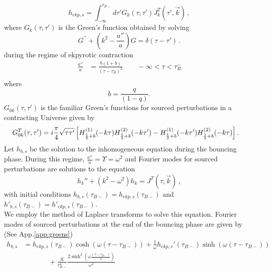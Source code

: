 \documentclass[12pt,a4paper]{article}
\numberwithin{equation}{section}
\numberwithin{equation}{section}
\begin{document}
\begin{equation}
h_{ekp,s} = \int_{-\infty}^{\tau_{B-}} d\tau' G_{k}(\tau,\tau') J^T_k (\tau',\Vec{k}) \, ,
\label{eq:vie} 
\end{equation}
where $G_k(\tau,\tau')$ is the Green's function obtained by solving
\begin{equation}
G^{ \prime \prime } + \left(k^2 - \frac{a''}{a}\right)G = \delta(\tau-\tau') \, .
\label{eq:greenfs}
\end{equation}
during the regime of ekpyrotic contraction 
\begin{equation}
\begin{split}
 \frac{a''}{a} &= \frac{b(1+b)}{(\tau-\tau_B^-)^2}  \qquad  -\infty < \tau < \tau_{B}^{-} \\
\end{split}
\end{equation}
where 
\begin{equation}
    b = \frac{q}{(1-q)}. 
\end{equation}
$G_{0k}(\tau,\tau')$ is the familiar Green's functions for sourced perturbations in a contracting Universe given by \cite{Artymowski:2020pci,r4,r1}
  \begin{equation}
\begin{split}
    G^T_{0k}(\tau,\tau') &= i   \frac{\pi}{4} \sqrt{\tau \tau'} %
    \left[H^{(1)}_{\frac{1}{2}+b}(-k\tau) H^{(2)}_{\frac{1}{2}+b}(-k\tau')-H^{(1)}_{\frac{1}{2}+b}(-k\tau')H^{(2)}_{\frac{1}{2}+b}(-k\tau)\right].\cr
    \end{split}
    \label{eq:geensfsten1}
\end{equation}
Let $h_{b,s}$ be the solution to the inhomogeneous equation during the bouncing phase. During this regime, $\frac{a''}{a} = \Upsilon = \omega^2$ and Fourier modes for sourced perturbations are solutions to the equation
\begin{equation}
    h_k'' + \left( k^2-\omega^2 \right) h_k =  J^T(\tau,\Vec{k} ) \, , \label{eq:vsourcedb}
\end{equation}
with initial conditions $h_{b,s}(\tau_{B-}) = h_{ekp,s}(\tau_{B-}) $ and $h'_{b,s}(\tau_{B-}) = h'_{ekp,s}(\tau_{B-})$. \\
We employ the method of Laplace transforms to solve this equation. Fourier modes of sourced perturbations at the end of the bouncing phase are given by (See App.\ref{app:greens})
\begin{equation}
\begin{split}
h_{b,s} &= h_{ekp,s}(\tau_{B-}) \cosh(\omega(\tau-\tau_{B-}))+ \frac{1}{\omega} h_{ekp,s}'(\tau_{B-}) \sinh(\omega(\tau-\tau_{B-})) \\
&\;\;\;\;\;\;\;\;\;\;\;\;\; 
+\frac{\mathcal{K}}{\tau^4_{B-}} \frac{2 \sinh^2\left( \omega \frac{(\tau-\tau_{B-})}{2}\right)}{\omega^2}
\label{eq:vi} 
\end{split}
\end{equation}
\end{document}
